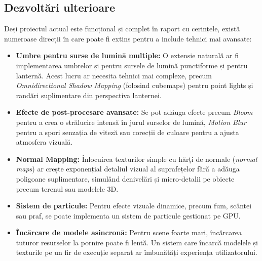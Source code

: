 \documentclass[11pt,a4paper]{article}
\begin{document}
\subsection{Dezvoltări ulterioare}
Deși proiectul actual este funcțional și complet în raport cu cerințele, există numeroase direcții în care poate fi extins pentru a include tehnici mai avansate:
\begin{itemize}
    \item \textbf{Umbre pentru surse de lumină multiple:} O extensie naturală ar fi implementarea umbrelor și pentru sursele de lumină punctiforme și pentru lanternă. Acest lucru ar necesita tehnici mai complexe, precum \textit{Omnidirectional Shadow Mapping} (folosind cubemaps) pentru point lights și randări suplimentare din perspectiva lanternei.
    \item \textbf{Efecte de post-procesare avansate:} Se pot adăuga efecte precum \textit{Bloom} pentru a crea o strălucire intensă în jurul surselor de lumină, \textit{Motion Blur} pentru a spori senzația de viteză sau corecții de culoare pentru a ajusta atmosfera vizuală.
    \item \textbf{Normal Mapping:} Înlocuirea texturilor simple cu hărți de normale (\textit{normal maps}) ar crește exponențial detaliul vizual al suprafețelor fără a adăuga poligoane suplimentare, simulând denivelări și micro-detalii pe obiecte precum terenul sau modelele 3D.
    \item \textbf{Sistem de particule:} Pentru efecte vizuale dinamice, precum fum, scântei sau praf, se poate implementa un sistem de particule gestionat pe GPU.
    \item \textbf{Încărcare de modele asincronă:} Pentru scene foarte mari, încărcarea tuturor resurselor la pornire poate fi lentă. Un sistem care încarcă modelele și texturile pe un fir de execuție separat ar îmbunătăți experiența utilizatorului.
\end{itemize}



\end{document}
